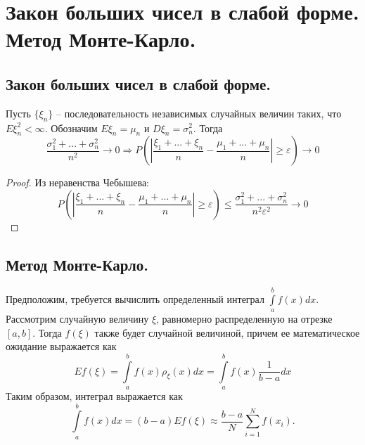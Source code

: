 \section{Закон больших чисел в слабой форме. Метод Монте-Карло.}

\subsection{Закон больших чисел в слабой форме.}
\begin{theorem}
    Пусть $\{\xi_n\}$ -- последовательность независимых случайных величин таких, что $E \xi_n^2 < \infty$. Обозначим $E \xi_n = \mu_n$ и $D \xi_n = \sigma_n^2$. Тогда
    \[
        \frac{\sigma_1^2 + ... + \sigma_n^2}{n^2} \to 0
        \Rightarrow
        P \left(
            \left|
                \frac{\xi_1 + ... + \xi_n}{n}
                -
                \frac{\mu_1 + ... + \mu_n}{n}
            \right| \geqslant \varepsilon
        \right) \to 0
    \]
    \begin{proof}
        Из неравенства Чебышева:
        \[
            P \left(
                \left|
                    \frac{\xi_1 + ... + \xi_n}{n}
                    -
                    \frac{\mu_1 + ... + \mu_n}{n}
                \right| \geqslant \varepsilon
            \right) \leqslant
            \frac{\sigma_1^2 + ... + \sigma_n^2}{n^2 \varepsilon^2} \to 0
        \]
    \end{proof}
\end{theorem}

\subsection{Метод Монте-Карло.}
Предположим, требуется вычислить определенный интеграл $\int \limits_a^b f(x) dx$.
Рассмотрим случайную величину $\xi$, равномерно распределенную на отрезке $[a,b]$. Тогда $f(\xi)$ также будет случайной величиной, причем ее математическое ожидание выражается как
\[
    E f(\xi) = \int \limits_a^b f(x) \rho_\xi(x) dx = \int \limits_a^b f(x) \frac{1}{b - a} dx
\]
Таким образом, интеграл выражается как
\[
    \int \limits_a^b f(x) dx = (b - a) E f(\xi) \approx
    \frac{b - a}{N} \sum_{i=1}^N f(x_i).
\]